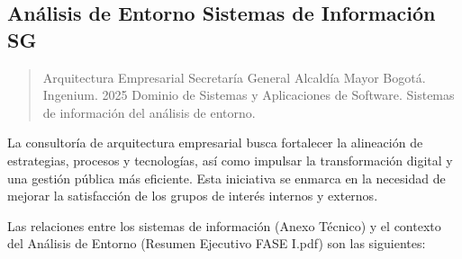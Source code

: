 \documentclass[
	a4paper, %
	12pt, %
]{include/CSSullivanBusinessReport}
\begin{document}
\subsection{Análisis de Entorno Sistemas de Información
SG}\label{sec:anuxe1lisis-de-entorno-sistemas-de-informaciuxf3n-sg}

\begin{quote}
Arquitectura Empresarial Secretaría General Alcaldía Mayor Bogotá.
Ingenium. 2025 Dominio de Sistemas y Aplicaciones de Software. Sistemas
de información del análisis de entorno.
\end{quote}

La consultoría de arquitectura empresarial busca fortalecer la
alineación de estrategias, procesos y tecnologías, así como impulsar la
transformación digital y una gestión pública más eficiente. Esta
iniciativa se enmarca en la necesidad de mejorar la satisfacción de los
grupos de interés internos y externos.

Las relaciones entre los sistemas de información (Anexo Técnico) y el
contexto del Análisis de Entorno (Resumen Ejecutivo FASE I.pdf) son las
siguientes:
\end{document}
